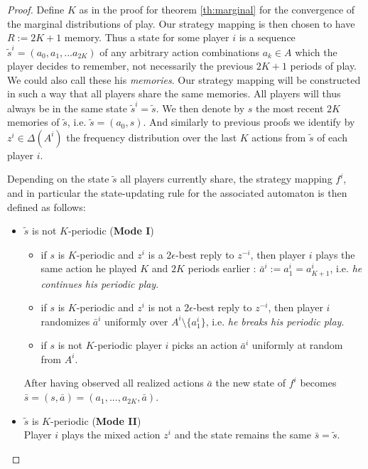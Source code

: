 \documentclass[a4paper]{article}
\theoremstyle{plain}
\theoremstyle{remark}
\begin{document}
\begin{proof}
	Define $K$ as in the proof for theorem \ref{th:marginal} for the convergence of the marginal
	distributions of play. Our strategy mapping is then chosen to have $R := 2K + 1$ memory.
	Thus a state for some player $i$ is a sequence $\tilde{s}^i = (a_0, a_1, ... a_{2K})$ of any arbitrary action combinations $a_k \in A$
	which the player decides to remember, not necessarily the previous $2K+1$ periods of play. We could also call these his \emph{memories}.
    Our strategy mapping will be constructed in such a way that all players share the same memories. All players will thus
    always be in the same state $\tilde{s}^i = \tilde{s}$.
	We then denote by $s$ the most recent $2K$ memories of $\tilde{s}$, i.e. $\tilde{s} = (a_0, s)$.
	And similarly to previous proofs we identify by $z^i \in \Delta(A^i)$ the frequency distribution over the
	last $K$ actions from $\tilde{s}$ of each player $i$.
	
	\medskip
	Depending on the state $\tilde{s}$ all players currently share, the strategy mapping $f^i$, and 
	in particular the state-updating rule for the associated automaton is then defined as follows:
	
	\begin{itemize}
		\item $\tilde{s}$ is not $K$-periodic ({\bf Mode I})
		\begin{itemize}
			\item	if $s$ is $K$-periodic and $z^i$ is a $2\epsilon$-best reply to $z^{-i}$, 
			then player $i$ plays the same action he played $K$ and $2K$ periods earlier : $\bar{a}^i := a^i_1 = a^i_{K+1}$,
			i.e. \emph{he continues his periodic play}.
			
			\item if $s$ is $K$-periodic and $z^i$ is not a $2\epsilon$-best reply to $z^{-i}$,
			then player $i$ randomizes $\bar{a}^i$ uniformly over $A^i \setminus \{a^i_1\}$,
			i.e. \emph{he breaks his periodic play}.
			
			\item if $s$ is not $K$-periodic player $i$ picks an action $\bar{a}^i$ uniformly at random from $A^i$.
		\end{itemize}
		After having observed all realized actions $\bar{a}$ the new state of $f^i$ becomes
		$\bar{s} = (s, \bar{a}) = (a_1, ..., a_{2K}, \bar{a})$.
			
		\item $\tilde{s}$ is $K$-periodic ({\bf Mode II})\\
			Player $i$ plays the mixed action $z^i$ and the state remains the same $\bar{s} = \tilde{s}$.
		

\end{itemize}
\end{proof}
\end{document}
